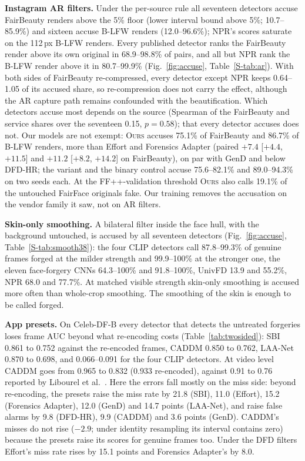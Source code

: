 \documentclass[conference]{IEEEtran}
\newcommand{\ours}{\textsc{Ours}}
\begin{document}
\textbf{Instagram AR filters.} Under the per-source rule all seventeen detectors accuse FairBeauty renders above the 5\% floor
(lower interval bound above 5\%; 10.7--85.9\%) and sixteen accuse B-LFW renders (12.0--96.6\%); NPR's scores saturate on the
112\,px B-LFW renders. Every published detector ranks the FairBeauty render above its own original in 68.9--98.8\% of pairs,
and all but NPR rank the B-LFW render above it in 80.7--99.9\% (Fig.~\ref{fig:accuse}, Table~\ref{S-tab:ar}). With both sides of FairBeauty re-compressed, every detector except NPR
keeps 0.64--1.05 of its accused share, so re-compression does not carry the effect, although the AR capture path remains
confounded with the beautification. Which detectors accuse most depends on the source (Spearman of the FairBeauty and service
shares over the seventeen 0.15, $p=0.58$); that every detector accuses does not. Our models are not exempt: \ours{} accuses
75.1\% of FairBeauty and 86.7\% of B-LFW renders, more than Effort and Forensics Adapter (paired $+7.4$ [$+4.4$, $+11.5$] and
$+11.2$ [$+8.2$, $+14.2$] on FairBeauty), on par with GenD and below DFD-HR; the variant and the binary control accuse
75.6--82.1\% and 89.0--94.3\% on two seeds each. At the FF++-validation threshold \ours{} also calls 19.1\% of the untouched
FairFace originals fake. Our training removes the accusation on the vendor family it saw, not on AR filters.

\textbf{Skin-only smoothing.} A bilateral filter inside the face hull, with the background untouched, is accused by all seventeen
detectors (Fig.~\ref{fig:accuse}, Table~\ref{S-tab:smooth38}): the four CLIP detectors call 87.8--99.3\% of genuine frames forged at
the milder strength and 99.9--100\% at the stronger one, the eleven face-forgery CNNs 64.3--100\% and 91.8--100\%, UnivFD 13.9
and 55.2\%, NPR 68.0 and 77.7\%. At matched visible strength skin-only smoothing is accused more often than whole-crop smoothing.
The smoothing of the skin is enough to be called forged.

\textbf{App presets.} On Celeb-DF-B every detector that detects the untreated forgeries loses frame AUC beyond what
re-encoding costs (Table~\ref{tab:twosided}): SBI 0.861 to 0.752 against the re-encoded frames, CADDM 0.850 to 0.762, LAA-Net
0.870 to 0.698, and 0.066--0.091 for the four CLIP detectors. At video level CADDM goes from 0.965 to 0.832 (0.933 re-encoded),
against 0.91 to 0.76 reported by Libourel et al.~\cite{libourel2024}. Here the errors fall mostly on the miss side: beyond
re-encoding, the presets raise the miss rate by 21.8 (SBI), 11.0 (Effort), 15.2 (Forensics Adapter), 12.0 (GenD) and 14.7 points
(LAA-Net), and raise false alarms by 9.8 (DFD-HR), 9.9 (CADDM) and 3.6 points (GenD). CADDM's misses do not rise ($-2.9$; under
identity resampling its interval contains zero) because the presets raise its scores for genuine frames too. Under the DFD filters
Effort's miss rate rises by 15.1 points and Forensics Adapter's by 8.0.
\end{document}
